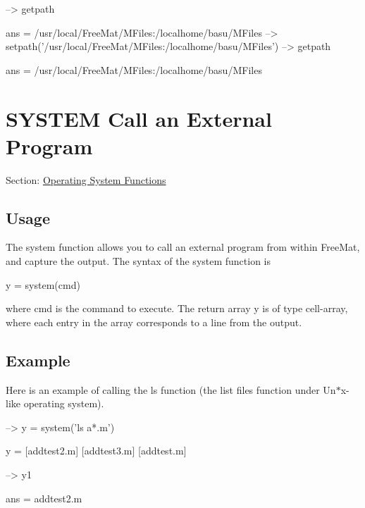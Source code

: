 \begin{DoxyVerbInclude}
--> getpath

ans = 
/usr/local/FreeMat/MFiles:/localhome/basu/MFiles
--> setpath('/usr/local/FreeMat/MFiles:/localhome/basu/MFiles')
--> getpath

ans = 
/usr/local/FreeMat/MFiles:/localhome/basu/MFiles
\end{DoxyVerbInclude}
 \hypertarget{os_system}{}\section{S\-Y\-S\-T\-E\-M Call an External Program}\label{os_system}
Section\-: \hyperlink{sec_os}{Operating System Functions} \hypertarget{vtkwidgets_vtkxyplotwidget_Usage}{}\subsection{Usage}\label{vtkwidgets_vtkxyplotwidget_Usage}
The {\ttfamily system} function allows you to call an external program from within Free\-Mat, and capture the output. The syntax of the {\ttfamily system} function is \begin{DoxyVerb}  y = system(cmd)
\end{DoxyVerb}
 where {\ttfamily cmd} is the command to execute. The return array {\ttfamily y} is of type {\ttfamily cell-\/array}, where each entry in the array corresponds to a line from the output. \hypertarget{variables_struct_Example}{}\subsection{Example}\label{variables_struct_Example}
Here is an example of calling the {\ttfamily ls} function (the list files function under Un$\ast$x-\/like operating system).


\begin{DoxyVerbInclude}
--> y = system('ls a*.m')

y = 
 [addtest2.m] [addtest3.m] [addtest.m] 

--> y{1}

ans = 
addtest2.m
\end{DoxyVerbInclude}
 